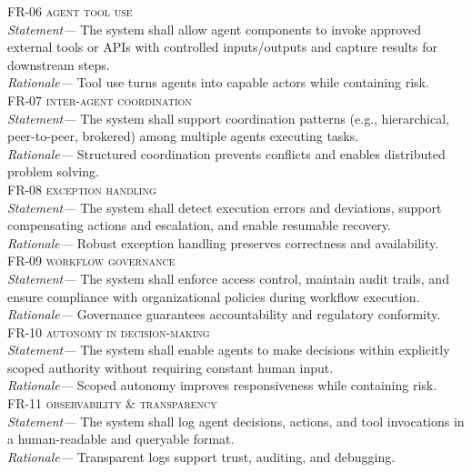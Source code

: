 \noindent \textsc{FR-06 agent tool use} \\
\indent \emph{Statement—} The system shall allow agent components to invoke approved external tools or APIs with controlled inputs/outputs and capture results for downstream steps. \\
\indent \emph{Rationale—} Tool use turns agents into capable actors while containing risk. \\

\noindent \textsc{FR-07 inter-agent coordination} \\
\indent \emph{Statement—} The system shall support coordination patterns (e.g., hierarchical, peer-to-peer, brokered) among multiple agents executing tasks. \\
\indent \emph{Rationale—} Structured coordination prevents conflicts and enables distributed problem solving. \\

\noindent \textsc{FR-08 exception handling} \\
\indent \emph{Statement—} The system shall detect execution errors and deviations, support compensating actions and escalation, and enable resumable recovery. \\
\indent \emph{Rationale—} Robust exception handling preserves correctness and availability. \\

\noindent \textsc{FR-09 workflow governance} \\
\indent \emph{Statement—} The system shall enforce access control, maintain audit trails, and ensure compliance with organizational policies during workflow execution. \\
\indent \emph{Rationale—} Governance guarantees accountability and regulatory conformity. \\

\noindent \textsc{FR-10 autonomy in decision-making} \\
\indent \emph{Statement—} The system shall enable agents to make decisions within explicitly scoped authority without requiring constant human input. \\
\indent \emph{Rationale—} Scoped autonomy improves responsiveness while containing risk. \\

\noindent \textsc{FR-11 observability \& transparency} \\
\indent \emph{Statement—} The system shall log agent decisions, actions, and tool invocations in a human-readable and queryable format. \\
\indent \emph{Rationale—} Transparent logs support trust, auditing, and debugging. \\

